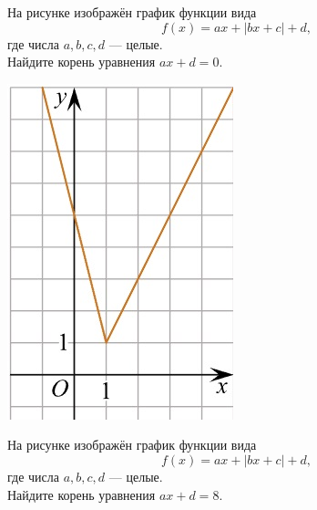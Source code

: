 \begin{class}[number=5]
\begin{listofex}
\begin{minipage}[t]{\picwidth}
		\end{minipage}
		\item
		\begin{minipage}[t]{\bodywidth}
			На рисунке изображён график функции вида \[ f(x)=ax+|bx+c|+d, \] где числа \(a, b, c, d\) --- целые.\\ Найдите корень уравнения \(ax+d=0\).
		\end{minipage}
		\hspace{0.05\linewidth}
		\begin{minipage}[t]{\picwidth}
			\includegraphics[align=t, width=\linewidth]{pics/G101M4C5-6.jpg}
		\end{minipage}
		\item
		\begin{minipage}[t]{\bodywidth}
			На рисунке изображён график функции вида \[ f(x)=ax+|bx+c|+d, \] где числа \(a, b, c, d\) --- целые.\\ Найдите корень уравнения \(ax+d=8\).

\end{minipage}
\end{listofex}
\end{class}
